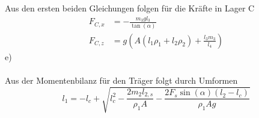 Aus den ersten beiden Gleichungen folgen für die Kräfte in Lager C
\begin{align*}
	F_{C,x} &= -\frac{m_3gl_3}{\tan(\alpha)} \\
	F_{C,z} &= g\left(A(l_1\rho_1 + l_2\rho_2) + \frac{l_3m_3}{l_4}\right)
\end{align*}
e) \\ \\
Aus der Momentenbilanz für den Träger folgt durch Umformen
\[
	l_1 = -l_c + \sqrt{l_c^2 - \frac{2m_2l_{2,s}}{\rho_1A} - \frac{2F_s\sin(\alpha)(l_2 - l_c)}{\rho_1Ag}}
\]